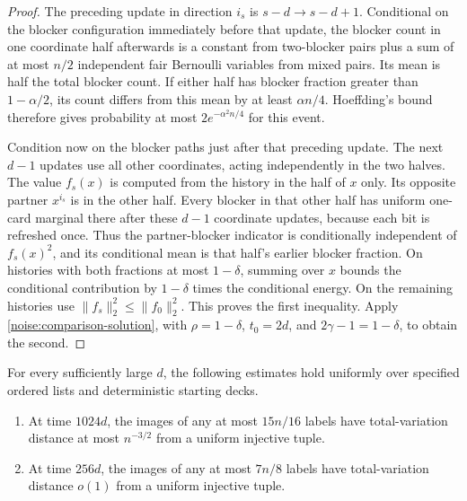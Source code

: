 \begin{proof}
The preceding update in direction $i_s$ is $s-d\to s-d+1$.
Conditional on the blocker configuration immediately before that update,
the blocker count in one coordinate half afterwards is a constant from
two-blocker pairs plus a sum of at most $n/2$ independent fair Bernoulli
variables from mixed pairs. Its mean is half the total blocker count.
If either half has blocker fraction greater than $1-\alpha/2$, its count
differs from this mean by at least $\alpha n/4$. Hoeffding's bound therefore
gives probability at most $2e^{-\alpha^2n/4}$ for this event.

Condition now on the blocker paths just after that preceding update.
The next $d-1$ updates use all other coordinates, acting independently
in the two halves. The value $f_s(x)$ is computed from the history in
the half of $x$ only. Its opposite partner $x^{i_s}$ is in the other
half. Every blocker in that other half has uniform one-card marginal
there after these $d-1$ coordinate updates, because each bit is refreshed
once. Thus the partner-blocker indicator is conditionally independent
of $f_s(x)^2$, and its conditional mean is that half's earlier blocker
fraction. On histories with both fractions at most $1-\delta$, summing
over $x$ bounds the conditional contribution by $1-\delta$ times the
conditional energy. On the remaining histories use
$\|f_s\|_2^2\le\|f_0\|_2^2$.
This proves the first inequality. Apply
\eqref{noise:comparison-solution}, with $\rho=1-\delta$,
$t_0=2d$, and $2\gamma-1=1-\delta$, to obtain the second.
\end{proof}

\begin{proposition}
\label{noise:uniform-marginals}
For every sufficiently large $d$, the following estimates hold uniformly
over specified ordered lists and deterministic starting decks.
\begin{enumerate}
\item At time $1024d$, the images of any at most $15n/16$ labels have
total-variation distance at most $n^{-3/2}$ from a uniform injective
tuple.
\item At time $256d$, the images of any at most $7n/8$ labels have
total-variation distance $o(1)$ from a uniform injective tuple.
\end{enumerate}
\end{proposition}

